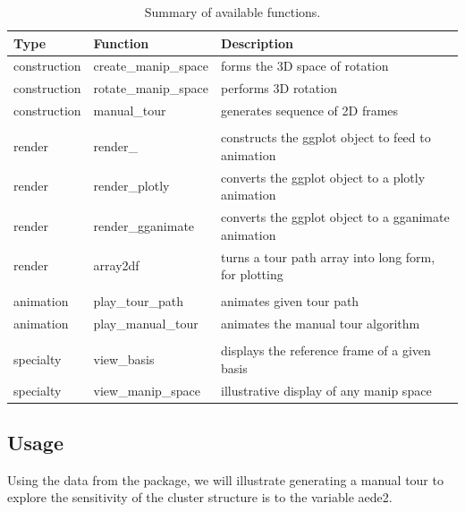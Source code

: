 \begin{Schunk}
\begin{table}[t]

\caption{\label{tab:functionsTable}Summary of available functions.}
\centering
\begin{tabular}{lll}
\toprule
Type & Function & Description\\
\midrule
construction & create\_manip\_space & forms the 3D space of rotation\\
construction & rotate\_manip\_space & performs 3D rotation\\
construction & manual\_tour & generates sequence of 2D frames\\
 &  & \\
render & render\_ & constructs the ggplot object to feed to animation\\
render & render\_plotly & converts the ggplot object to a plotly animation\\
render & render\_gganimate & converts the ggplot object to a gganimate  animation\\
render & array2df & turns a tour path array into long form, for plotting\\
 &  & \\
animation & play\_tour\_path & animates given tour path\\
animation & play\_manual\_tour & animates the manual tour algorithm\\
 &  & \\
specialty & view\_basis & displays the reference frame of a given basis\\
specialty & view\_manip\_space & illustrative display of any manip space\\
\bottomrule
\end{tabular}
\end{table}

\end{Schunk}

\hypertarget{usage}{%
\subsection{Usage}\label{usage}}

Using the  data from the  package, we will
illustrate generating a manual tour to explore the sensitivity of the
cluster structure is to the variable aede2.

